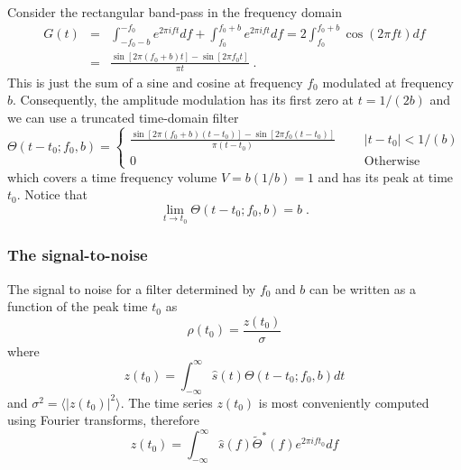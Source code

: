 Consider the rectangular band-pass in the frequency domain
\begin{eqnarray}
G(t) &=& \int_{-f_0 - b}^{-f_0} e^{2 \pi i f t} df  +
\int_{f_0}^{f_0+b}  e^{2 \pi i f t} df 
= 2 \int_{f_0}^{f_0+b} \cos ( 2 \pi f t ) df \\
&=& \frac{\sin[2\pi(f_0+b)t] - \sin[2 \pi f_0 t]}{\pi t} \; .
\end{eqnarray}
This is just the sum of a sine and cosine at
frequency $f_0$ modulated at frequency $b$.
Consequently,  the amplitude modulation has its first zero at
$t = 1/ (2 b)$ and we can use a truncated time-domain filter
\begin{equation}
\Theta(t - t_0; f_0 , b) = \left\{
\begin{array}{lrl}
\displaystyle{
\frac{\sin[2\pi(f_0+b)(t-t_0)] - \sin[2 \pi f_0 (t-t_0)]}{\pi (t-t_0)} 
} & \mbox{\ \ } & |t-t_0| < 1/(b)  \\
0 & & \textrm{Otherwise}
\end{array} \right. 
\label{eq:filter}
\end{equation}
which covers a time frequency volume $V = b (1/b) = 1$ and has its
peak at time $t_0$.   Notice that
\begin{equation}
\lim_{t\rightarrow t_0} \Theta(t - t_0; f_0 , b) = b\; .
\end{equation}

\subsubsection{The signal-to-noise}

The signal to noise for a filter determined by $f_0$ and $b$ can be
written as a function of the peak time $t_0$ as
\begin{equation}
\rho(t_0) = \frac{z(t_0)}{\sigma}
\end{equation}
where
\begin{equation}
z(t_0) = \int_{-\infty}^\infty \hat{s}(t) \Theta(t-t_0; f_0, b) 
dt
\end{equation} and $\sigma^2 = \langle |z(t_0)|^2 \rangle$.  The time
series $z(t_0)$ is most conveniently computed using Fourier
transforms,  therefore
\begin{equation}
z(t_0) = \int_{-\infty}^{\infty} \hat{s}(f) \tilde{\Theta}^\ast (f) 
e^{2 \pi i ft_0} df
\end{equation}

